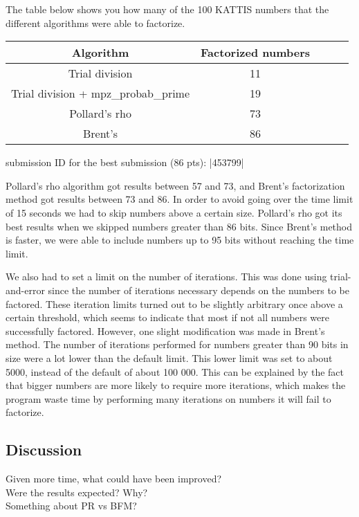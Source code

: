 \documentclass[paper=a4, fontsize=11pt,numbers=endperiod]{scrartcl} %
\numberwithin{equation}{section} %
\numberwithin{figure}{section} %
\numberwithin{table}{section} %
\begin{document}
The table below shows you how many of the 100 KATTIS numbers that the different algorithms were able to factorize.

    \begin{tabular}{|c|c|c|c|c|}
    \hline
    \textbf{Algorithm} & \textbf{Factorized numbers} \\ \hline
    Trial division & 11 \\ \hline
    Trial division + mpz\_probab\_prime & 19 \\ \hline
    Pollard's rho & 73 \\ \hline
    Brent's & 86 \\ \hline
    \end{tabular}
    \hspace{10pt}

    submission ID for the best submission (86 pts): |453799|

Pollard's rho algorithm got results between 57 and 73, and Brent's factorization method got results between 73 and 86.
In order to avoid going over the time limit of 15 seconds we had to skip numbers above a certain size. Pollard's rho got its best results when we skipped numbers greater than 86 bits. Since Brent's method is faster, we were able to include numbers up to 95 bits without reaching the time limit. 

We also had to set a limit on the number of iterations. This was done using trial-and-error since the number of iterations necessary depends on the numbers to be factored. These iteration limits turned out to be slightly arbitrary once above a certain threshold, which seems to indicate that most if not all numbers were successfully factored. However, one slight modification was made in Brent's method. The number of iterations performed for numbers greater than 90 bits in size were a lot lower than the default limit. This lower limit was set to about 5000, instead of the default of about 100 000. This can be explained by the fact that bigger numbers are more likely to require more iterations, which makes the program waste time by performing many iterations on numbers it will fail to factorize.


\subsection{Discussion}
Given more time, what could have been improved?\\
Were the results expected? Why?\\
Something about PR vs BFM?\\
\end{document}
